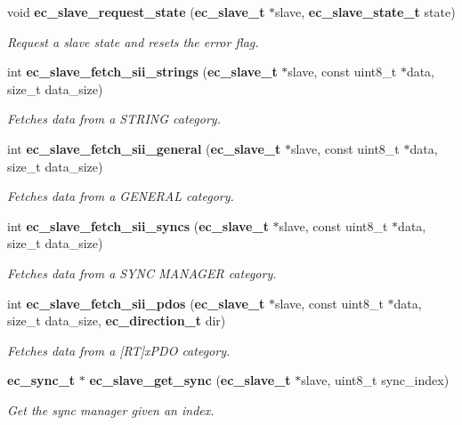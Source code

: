 \begin{DoxyCompactItemize}
void {\bf ec\-\_\-slave\-\_\-request\-\_\-state} ({\bf ec\-\_\-slave\-\_\-t} $\ast$slave, {\bf ec\-\_\-slave\-\_\-state\-\_\-t} state)
\begin{DoxyCompactList}\small\item\em \-Request a slave state and resets the error flag. \end{DoxyCompactList}\item 
int {\bf ec\-\_\-slave\-\_\-fetch\-\_\-sii\-\_\-strings} ({\bf ec\-\_\-slave\-\_\-t} $\ast$slave, const uint8\-\_\-t $\ast$data, size\-\_\-t data\-\_\-size)
\begin{DoxyCompactList}\small\item\em \-Fetches data from a \-S\-T\-R\-I\-N\-G category. \end{DoxyCompactList}\item 
int {\bf ec\-\_\-slave\-\_\-fetch\-\_\-sii\-\_\-general} ({\bf ec\-\_\-slave\-\_\-t} $\ast$slave, const uint8\-\_\-t $\ast$data, size\-\_\-t data\-\_\-size)
\begin{DoxyCompactList}\small\item\em \-Fetches data from a \-G\-E\-N\-E\-R\-A\-L category. \end{DoxyCompactList}\item 
int {\bf ec\-\_\-slave\-\_\-fetch\-\_\-sii\-\_\-syncs} ({\bf ec\-\_\-slave\-\_\-t} $\ast$slave, const uint8\-\_\-t $\ast$data, size\-\_\-t data\-\_\-size)
\begin{DoxyCompactList}\small\item\em \-Fetches data from a \-S\-Y\-N\-C \-M\-A\-N\-A\-G\-E\-R category. \end{DoxyCompactList}\item 
int {\bf ec\-\_\-slave\-\_\-fetch\-\_\-sii\-\_\-pdos} ({\bf ec\-\_\-slave\-\_\-t} $\ast$slave, const uint8\-\_\-t $\ast$data, size\-\_\-t data\-\_\-size, {\bf ec\-\_\-direction\-\_\-t} dir)
\begin{DoxyCompactList}\small\item\em \-Fetches data from a [\-R\-T]x\-P\-D\-O category. \end{DoxyCompactList}\item 
{\bf ec\-\_\-sync\-\_\-t} $\ast$ {\bf ec\-\_\-slave\-\_\-get\-\_\-sync} ({\bf ec\-\_\-slave\-\_\-t} $\ast$slave, uint8\-\_\-t sync\-\_\-index)
\begin{DoxyCompactList}\small\item\em \-Get the sync manager given an index. \end{DoxyCompactList}\item 

\end{DoxyCompactItemize}

